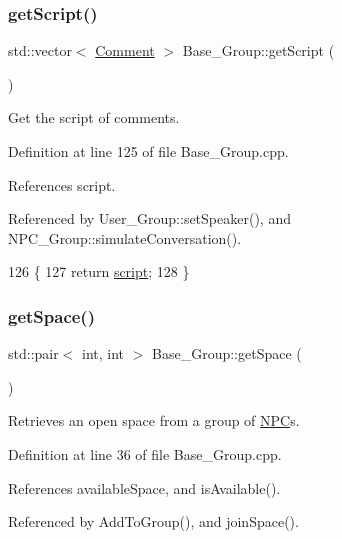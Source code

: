 \subsubsection{\texorpdfstring{get\+Script()}{getScript()}}
{\footnotesize\ttfamily std\+::vector$<$ \hyperlink{class_comment}{Comment} $>$ Base\+\_\+\+Group\+::get\+Script (\begin{DoxyParamCaption}{ }\end{DoxyParamCaption})}



Get the script of comments. 



Definition at line 125 of file Base\+\_\+\+Group.\+cpp.



References script.



Referenced by User\+\_\+\+Group\+::set\+Speaker(), and N\+P\+C\+\_\+\+Group\+::simulate\+Conversation().


\begin{DoxyCode}
126 \{
127     \textcolor{keywordflow}{return} \hyperlink{class_base___group_a98fbcb0bb85a488e29db9465c18715cc}{script};
128 \}
\end{DoxyCode}
\mbox{\label{class_base___group_a4f6559c7a35e04e6355454df2e3be3b2}} 
\subsubsection{\texorpdfstring{get\+Space()}{getSpace()}}
{\footnotesize\ttfamily std\+::pair$<$ int, int $>$ Base\+\_\+\+Group\+::get\+Space (\begin{DoxyParamCaption}{ }\end{DoxyParamCaption})}



Retrieves an open space from a group of \hyperlink{class_n_p_c}{N\+PC}\textquotesingle{}s. 



Definition at line 36 of file Base\+\_\+\+Group.\+cpp.



References available\+Space, and is\+Available().



Referenced by Add\+To\+Group(), and join\+Space().


